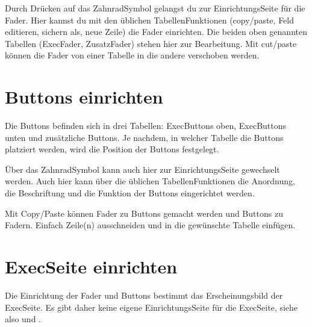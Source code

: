 \documentclass[letterpaper,10pt,ngerman]{sphinxmanual}
\begin{document}
\noindent{}

Durch Drücken auf das Zahnrad\sphinxhyphen{}Symbol gelangst du zur Einrichtungs\sphinxhyphen{}Seite für die
Fader. Hier kannst du mit den üblichen Tabellen\sphinxhyphen{}Funktionen (copy/paste,
Feld editieren, sichern als, neue Zeile) die Fader einrichten. Die beiden oben
genannten Tabellen (Exec\sphinxhyphen{}Fader, Zusatz\sphinxhyphen{}Fader) stehen hier zur Bearbeitung.
Mit cut/paste können die Fader von einer Tabelle in die andere
verschoben werden.

\noindent{}


\section{Buttons einrichten}
\label{\detokenize{einrichten:buttons-einrichten}}\label{\detokenize{einrichten:buttons}}
Die Buttons befinden sich in drei Tabellen:  Exec\sphinxhyphen{}Buttons oben, Exec\sphinxhyphen{}Buttons
unten und zusätzliche Buttons. Je nachdem, in welcher Tabelle die Buttons
platziert werden, wird die Position der Buttons festgelegt.

\noindent{}

Über das Zahnrad\sphinxhyphen{}Symbol kann auch hier zur Einrichtungs\sphinxhyphen{}Seite
gewechselt werden. Auch hier kann über die üblichen Tabellen\sphinxhyphen{}Funktionen
die Anordnung, die Beschriftung und die Funktion der Buttons eingerichtet
werden.

Mit Copy/Paste können Fader zu Buttons gemacht werden und Buttons zu Fadern.
Einfach Zeile(n) ausschneiden und in die gewünschte Tabelle einfügen.

\noindent{}


\section{Exec\sphinxhyphen{}Seite einrichten}
\label{\detokenize{einrichten:exec-seite-einrichten}}\label{\detokenize{einrichten:execsetup}}
Die Einrichtung der Fader und Buttons bestimmt das Erscheinungsbild
der Exec\sphinxhyphen{}Seite. Es gibt daher keine eigene Einrichtungs\sphinxhyphen{}Seite für die
Exec\sphinxhyphen{}Seite, siehe also {\hyperref[\detokenize{einrichten:fader}]{}} und   {\hyperref[\detokenize{einrichten:buttons}]{}} .
\end{document}
